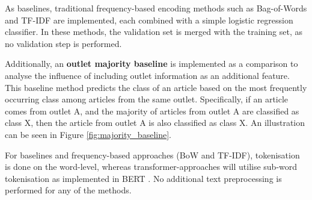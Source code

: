 As baselines, traditional frequency-based encoding methods such as Bag-of-Words and TF-IDF are implemented, each combined with a simple logistic regression classifier. In these methods, the validation set is merged with the training set, as no validation step is performed.

Additionally, an \textbf{outlet majority baseline} is implemented as a comparison to analyse the influence of including outlet information as an additional feature. This baseline method predicts the class of an article based on the most frequently occurring class among articles from the same outlet. Specifically, if an article comes from outlet A, and the majority of articles from outlet A are classified as class X, then the article from outlet A is also classified as class X. An illustration can be seen in Figure \ref{fig:majority_baseline}.

For baselines and frequency-based approaches (BoW and TF-IDF), tokenisation is done on the word-level, whereas transformer-approaches will utilise sub-word tokenisation as implemented in BERT \cite{devlin-2019-bert}. No additional text preprocessing is performed for any of the methods.


